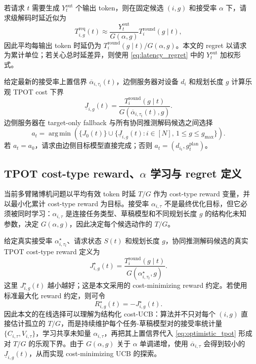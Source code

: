 \documentclass[11pt,a4paper]{ctexart}
\newcommand{\argmin}{\operatorname*{arg\,min}}
\begin{document}
若请求 $t$ 需要生成 $Y_t^{\mathrm{out}}$ 个输出 token，则在固定候选 $(i,g)$ 和接受率 $\alpha$ 下，请求级解码时延近似为
\begin{equation}
    T_{i,g}^{\mathrm{req}}(t)
    \approx
    \frac{
    Y_t^{\mathrm{out}}
    }{
    G(\alpha,g)
    }
    T_i^{\mathrm{round}}(g\mid t),
    \label{eq:request_latency}
\end{equation}
因此平均每输出 token 时延仍为 $T_i^{\mathrm{round}}(g\mid t)/G(\alpha,g)$。本文的 regret 以请求为累计单位；若关心总时延差异，则使用 \cref{eq:latency_regret} 中的 $Y_t^{\mathrm{out}}$ 加权形式。

给定最新的接受率上置信界 $\overline{\alpha}_{i,\tau_t}(t)$，边侧服务器对设备 $d_i$ 和规划长度 $g$ 计算乐观 TPOT cost 下界
\begin{equation}
    \underline{J}_{i,g}(t)
    =
    \frac{
    T_i^{\mathrm{round}}(g\mid t)
    }{
    G(\overline{\alpha}_{i,\tau_t}(t),g)
    }.
    \label{eq:optimistic_tpot}
\end{equation}
边侧服务器在 target-only fallback 与所有协同推测解码候选之间选择
\begin{equation}
    a_t
    =
    \argmin
    \left(
    \{J_0(t)\}
    \cup
    \{\underline{J}_{i,g}(t):i\in[N],\,1\leq g\leq g_{\max}\}
    \right).
    \label{eq:model_selection_rule}
\end{equation}
若 $a_t=a_0$，请求由边侧目标模型直接完成；否则 $a_t=(d_{i_t},g_t^{\mathrm{plan}})$。

\subsection{TPOT cost-type reward、$\alpha$ 学习与 regret 定义}
\label{subsec:reward_regret}

当前多臂赌博机问题以平均有效 token 时延 $T/G$ 作为 cost-type reward 变量，并以最小化累计 cost-type reward 为目标。接受率 $\alpha_{i,\tau}$ 不是最终优化目标，但它必须被同时学习：$\alpha_{i,\tau}$ 是连接任务类型、草稿模型和不同规划长度 $g$ 的结构化未知参数，决定 $G(\alpha,g)$，因此决定每个候选动作的 $T/G$。

给定真实接受率 $\alpha^\star_{i,\tau_t}$、请求状态 $S(t)$ 和规划长度 $g$，协同推测解码候选的真实 TPOT cost-type reward 定义为
\begin{equation}
    J_{i,g}^{\star}(t)
    =
    \frac{
    T_i^{\mathrm{round}}(g\mid t)
    }{
    G(\alpha^\star_{i,\tau_t},g)
    }.
    \label{eq:true_tpot}
\end{equation}
这里 $J_{i,g}^{\star}(t)$ 越小越好；这是本文采用的 cost-minimizing reward 约定。若使用标准最大化 reward 约定，则可令
\begin{equation}
    R_{i,g}^{\star}(t)
    =
    -J_{i,g}^{\star}(t).
    \label{eq:max_reward}
\end{equation}
因此本文的在线选择可以理解为结构化 cost-UCB：算法并不只对每个 $(i,g)$ 直接估计孤立的 $T/G$，而是持续维护每个任务-草稿模型对的接受率统计量 $\{C_{i,\tau},V_{i,\tau}\}$，学习共享未知量 $\alpha_{i,\tau}$，再把其上置信界代入 \cref{eq:optimistic_tpot} 形成对 $T/G$ 的乐观下界。由于 $G(\alpha,g)$ 关于 $\alpha$ 单调递增，使用 $\overline{\alpha}_{i,\tau}$ 会得到较小的 $\underline{J}_{i,g}(t)$，从而实现 cost-minimizing UCB 的探索。
\end{document}

